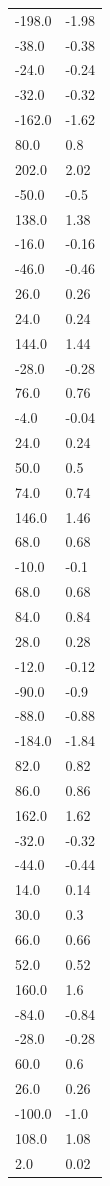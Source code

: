 \begin{longtable}{ll}
-198.0 & -1.98 \\
-38.0 & -0.38 \\
-24.0 & -0.24 \\
-32.0 & -0.32 \\
-162.0 & -1.62 \\
80.0 & 0.8 \\
202.0 & 2.02 \\
-50.0 & -0.5 \\
138.0 & 1.38 \\
-16.0 & -0.16 \\
-46.0 & -0.46 \\
26.0 & 0.26 \\
24.0 & 0.24 \\
144.0 & 1.44 \\
-28.0 & -0.28 \\
76.0 & 0.76 \\
-4.0 & -0.04 \\
24.0 & 0.24 \\
50.0 & 0.5 \\
74.0 & 0.74 \\
146.0 & 1.46 \\
68.0 & 0.68 \\
-10.0 & -0.1 \\
68.0 & 0.68 \\
84.0 & 0.84 \\
28.0 & 0.28 \\
-12.0 & -0.12 \\
-90.0 & -0.9 \\
-88.0 & -0.88 \\
-184.0 & -1.84 \\
82.0 & 0.82 \\
86.0 & 0.86 \\
162.0 & 1.62 \\
-32.0 & -0.32 \\
-44.0 & -0.44 \\
14.0 & 0.14 \\
30.0 & 0.3 \\
66.0 & 0.66 \\
52.0 & 0.52 \\
160.0 & 1.6 \\
-84.0 & -0.84 \\
-28.0 & -0.28 \\
60.0 & 0.6 \\
26.0 & 0.26 \\
-100.0 & -1.0 \\
108.0 & 1.08 \\
2.0 & 0.02 \\

\end{longtable}
